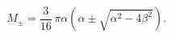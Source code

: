 \begin{equation}
M_{\pm}=\frac{3}{16}\,\pi\alpha (\alpha \pm \sqrt{\alpha^{2}-4\beta^{2}}).
\end{equation}

